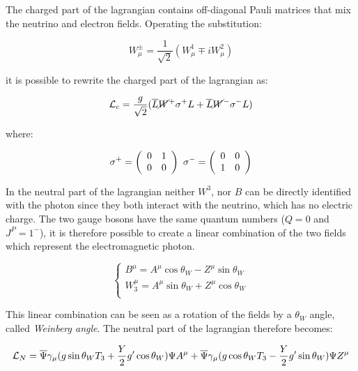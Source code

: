 The charged part of the lagrangian contains off-diagonal Pauli matrices that mix the neutrino and electron fields. Operating the substitution:

\begin{equation}
W^\pm_\mu = \frac{1}{\sqrt{2}}(W^{1}_{\mu} \mp i W^{2}_{\mu})
\label{eq:wpm_def}
\end{equation}

it is possible to rewrite the charged part of the lagrangian as:

\begin{equation}
\mathcal{L}_c = \frac{g}{\sqrt{2}}(\overline{L}\cancel{W}^{+} \sigma^{+} L +\overline{L}\cancel{W}^{-}\sigma^{-} L)
\end{equation}

where:

\begin{equation}
\sigma^+ = \left(\begin{array}{cc}0 & 1 \\0 & 0\end{array}\right)\,\, \sigma^- = \left(\begin{array}{cc}0 & 0 \\1 & 0\end{array}\right)
\end{equation}

In the neutral part of the lagrangian neither $W^3$, nor $B$ can be directly identified with the photon since they both interact with the neutrino, which has no electric charge. The two gauge bosons have the same quantum numbers ($Q = 0$ and $J^P = 1^-$), it is therefore possible to create a linear combination of the two fields which represent the electromagnetic photon.

\begin{equation}
\left\{\begin{matrix}
B^{\mu}=A^{\mu}\operatorname{cos}\theta_{W}-Z^{\mu}\operatorname{sin}\theta_{W}\\ 

W^{\mu}_3=A^{\mu}\operatorname{sin}\theta_{W}+Z^{\mu}\cos\theta_{W}\\ 
\end{matrix}\right.
\label{eq:su2_rotation}
\end{equation}

This linear combination can be seen as a rotation of the fields by a $\theta_W$ angle, called \emph{Weinberg angle}. 
The neutral part of the lagrangian therefore becomes:
 
\begin{equation}
\mathcal{L}_{N}=\overline{\Psi}\gamma_{\mu}(g\operatorname{sin}\theta_{W}T_3+ \frac{Y}{2}g'\operatorname{cos}\theta_{W})\Psi A^{\mu}+\overline{\Psi}\gamma_{\mu}(g\operatorname{cos}\theta_{W}T_3- \frac{Y}{2}g'\operatorname{sin}\theta_{W})\Psi Z^{\mu}
\end{equation}

